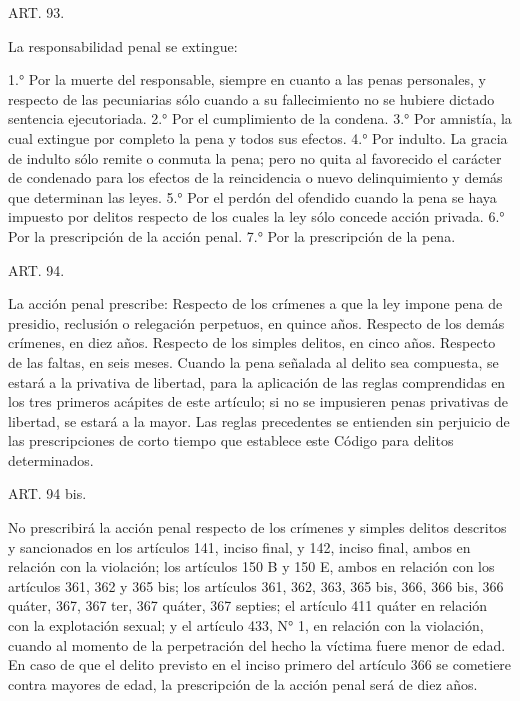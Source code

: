     ART. 93.

    La responsabilidad penal se extingue:

    1.° Por la muerte del responsable, siempre en cuanto a las penas personales, y respecto de las pecuniarias sólo cuando a su fallecimiento no se hubiere dictado sentencia ejecutoriada.
    2.° Por el cumplimiento de la condena.
    3.° Por amnistía, la cual extingue por completo la pena y todos sus efectos.
    4.° Por indulto.
    La gracia de indulto sólo remite o conmuta la pena; pero no quita al favorecido el carácter de condenado para los efectos de la reincidencia o nuevo delinquimiento y demás que determinan las leyes.
    5.° Por el perdón del ofendido cuando la pena se haya impuesto por delitos respecto de los cuales la ley sólo concede acción privada.
    6.° Por la prescripción de la acción penal.
    7.° Por la prescripción de la pena.


    ART. 94.

    La acción penal prescribe:
    Respecto de los crímenes a que la ley impone pena de presidio, reclusión o relegación perpetuos, en quince años.
    Respecto de los demás crímenes, en diez años.
    Respecto de los simples delitos, en cinco años.
    Respecto de las faltas, en seis meses.
    Cuando la pena señalada al delito sea compuesta, se estará a la privativa de libertad, para la aplicación de las reglas comprendidas en los tres primeros acápites de este artículo; si no se impusieren penas privativas de libertad, se estará a la mayor.
    Las reglas precedentes se entienden sin perjuicio de las prescripciones de corto tiempo que establece este Código para delitos determinados.





    ART. 94 bis.

    No prescribirá la acción penal respecto de los crímenes y simples delitos descritos y sancionados en los artículos 141, inciso final, y 142, inciso final, ambos en relación con la violación; los artículos 150 B y 150 E, ambos en relación con los artículos 361, 362 y 365 bis; los artículos 361, 362, 363, 365 bis, 366, 366 bis, 366 quáter, 367, 367 ter, 367 quáter, 367 septies; el artículo 411 quáter en relación con la explotación sexual; y el artículo 433, N° 1, en relación con la violación, cuando al momento de la perpetración del hecho la víctima fuere menor de edad.
    En caso de que el delito previsto en el inciso primero del artículo 366 se cometiere contra mayores de edad, la prescripción de la acción penal será de diez años.



